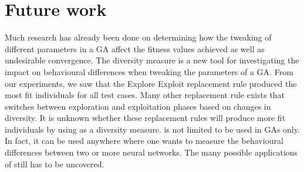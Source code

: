 \section{Future work}\label{sec:futurework}
Much research has already been done on determining how the tweaking of different parameters in a GA affect the fitness values achieved as well as undesirable convergence. The diversity measure \dia is a new tool for investigating the impact on behavioural differences when tweaking the parameters of a GA.
From our experiments, we saw that the Explore Exploit replacement rule produced the most fit individuals for all test cases.
Many other replacement rule exists that switches between exploration and exploitation phases based on changes in diversity.
It is unknown whether these replacement rules will produce more fit individuals by using \dia as a diversity measure.
\dia is not limited to be used in GAs only. In fact, it can be used anywhere where one wants to measure the behavioural differences between two or more neural networks. The many possible applications of \dia still has to be uncovered. 